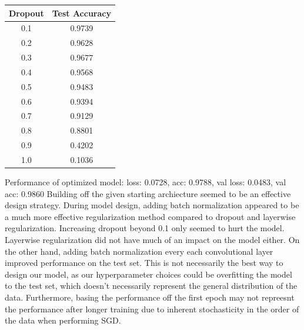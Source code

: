 \begin{solution}
  \begin{center}
    \begin{tabular}{||c c||} 
     \hline
     Dropout & Test Accuracy \\ [0.5ex] 
     \hline\hline
     0.1 & 0.9739 \\ 
     \hline
     0.2 & 0.9628 \\
     \hline
     0.3 & 0.9677 \\
     \hline
     0.4 & 0.9568 \\
     \hline
     0.5 & 0.9483 \\ 
     \hline
     0.6 & 0.9394 \\ 
     \hline
     0.7 & 0.9129 \\ 
     \hline
     0.8 & 0.8801 \\ 
     \hline
     0.9 & 0.4202 \\ 
     \hline
     1.0 & 0.1036 \\ 
     \hline
    \end{tabular}
  \end{center}
Performance of optimized model: loss: 0.0728, acc: 0.9788, val loss: 0.0483, val acc: 0.9860 \newline
Building off the given starting archiecture seemed to be an effective design strategy. During model design, adding batch normalization appeared to be a much more effective regularization method compared to dropout and layerwise regularization. Increasing dropout beyond 0.1 only seemed to hurt the model. Layerwise regularization did not have much of an impact on the model either. On the other hand, adding batch normalization every each convolutional layer improved performance on the test set. \newline
This is not necessarily the best way to design our model, as our hyperparameter choices could be overfitting the model to the test set, which doesn't necessarily represent the general distribution of the data. Furthermore, basing the performance off the first epoch may not repreesnt the performance after longer training due to inherent stochasticity in the order of the data when performing SGD.
\end{solution}



